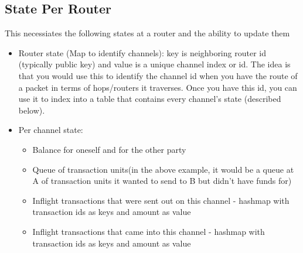 \documentclass[a4paper]{article}
\newcommand{\TUs}{transaction units\xspace}
\begin{document}
\subsection{State Per Router}
This necessiates the following states at a router and the ability to update them
\begin{itemize}
    \item Router state (Map to identify channels): key is neighboring router id (typically public key) and value is a unique channel index or id. 
        The idea is that you would use this to identify the channel id when you have the route of a packet in terms of hops/routers it traverses. Once you have this id,
        you can use it to index into a table that contains every channel's state (described below).
    \item Per channel state:
        \begin{itemize}
            \item Balance for oneself and for the other party
            \item Queue of \TUs (in the above example, it would be a queue at A of \TUs it wanted to send to B but didn't have funds for)
            \item Inflight transactions that were sent out on this channel - hashmap with transaction ids as keys and amount as value
            \item Inflight transactions that came into this channel - hashmap with transaction ids as keys and amount as value
        \end{itemize}
\end{itemize}
\end{document}
